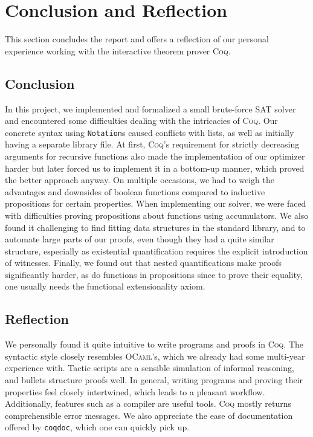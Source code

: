 \section{Conclusion and Reflection}

This section concludes the report and offers a reflection of our personal experience working with the interactive theorem prover \textsc{Coq}.

\subsection{Conclusion}

In this project, we implemented and formalized a small brute-force SAT solver and encountered some difficulties dealing with the intricacies of \textsc{Coq}.
Our concrete syntax using \texttt{Notation}s caused conflicts with lists, as well as initially having a separate library file.
At first, \textsc{Coq}'s requirement for strictly decreasing arguments for recursive functions also made the implementation of our optimizer harder but later forced us to implement it in a bottom-up manner, which proved the better approach anyway.
On multiple occasions, we had to weigh the advantages and downsides of boolean functions compared to inductive propositions for certain properties.
When implementing our solver, we were faced with difficulties proving propositions about functions using accumulators.
We also found it challenging to find fitting data structures in the standard library, and to automate large parts of our proofs, even though they had a quite similar structure, especially as existential quantification requires the explicit introduction of witnesses.
Finally, we found out that nested quantifications make proofs significantly harder, as do functions in propositions since to prove their equality, one usually needs the functional extensionality axiom.

\subsection{Reflection}

We personally found it quite intuitive to write programs and proofs in \textsc{Coq}.
The syntactic style closely resembles \textsc{OCaml}'s, which we already had some multi-year experience with.
Tactic scripts are a sensible simulation of informal reasoning, and bullets structure proofs well.
In general, writing programs and proving their properties feel closely intertwined, which leads to a pleasant workflow.
Additionally, features such as a compiler are useful tools.
\textsc{Coq} mostly returns comprehensible error messages.
We also appreciate the ease of documentation offered by \texttt{coqdoc}, which one can quickly pick up.

